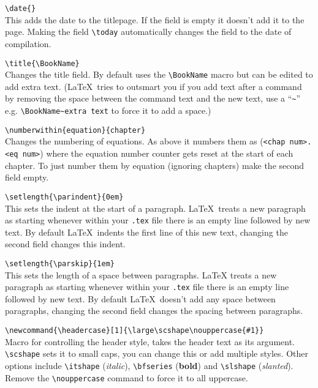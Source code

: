 \documentclass[Book Template.tex]{subfiles}
\begin{document}
                \verb+\date{}+\\
                This adds the date to the titlepage. If the field is empty it doesn't add it to the page. Making the field \verb+\today+ automatically changes the field to the date of compilation.

                \verb+\title{\BookName}+\\
                Changes the title field. By default uses the \verb+\BookName+ macro but can be edited to add extra text. (\LaTeX~tries to outsmart you if you add text after a command by removing the space between the command text and the new text, use a ``\verb+~+'' e.g. \verb+\BookName~extra text+ to force it to add a space.)

                \verb+\numberwithin{equation}{chapter}+\\
                Changes the numbering of equations. As above it numbers them as (\verb+<chap num>.<eq num>+) where the equation number counter gets reset at the start of each chapter. To just number them by equation (ignoring chapters) make the second field empty.

                \newpage

                \verb+\setlength{\parindent}{0em}+\\
                This sets the indent at the start of a paragraph. \LaTeX~treats a new paragraph as starting whenever within your \verb+.tex+ file there is an empty line followed by new text. By default \LaTeX~indents the first line of this new text, changing the second field changes this indent.

                \verb+\setlength{\parskip}{1em}+\\
                This sets the length of a space between paragraphs. LaTeX treats a new paragraph as starting whenever within your \verb+.tex+ file there is an empty line followed by new text. By default \LaTeX~doesn't add any space between paragraphs, changing the second field changes the spacing between paragraphs.

                \verb+\newcommand{\headercase}[1]{\large\scshape\nouppercase{#1}}+\\
                Macro for controlling the header style, takes the header text as its argument. \verb+\scshape+ sets it to small caps, you can change this or add multiple styles. Other options include \verb+\itshape+ ({\itshape italic}), \verb+\bfseries+ ({\bfseries bold}) and \verb+\slshape+ ({\slshape slanted}).\\
                Remove the \verb+\nouppercase+ command to force it to all uppercase.
\end{document}
